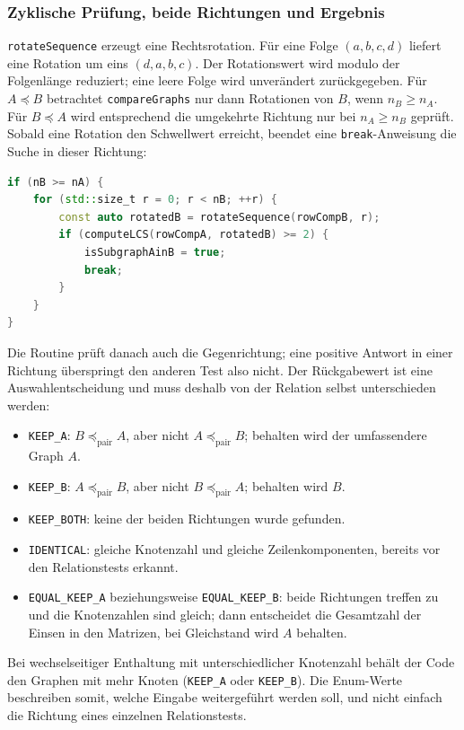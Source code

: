 \documentclass[a4paper,12pt, twoside]{report}
\theoremstyle{definition}
\begin{document}
\subsubsection*{Zyklische Prüfung, beide Richtungen und Ergebnis}

\texttt{rotateSequence} erzeugt eine Rechtsrotation. Für eine Folge $(a,b,c,d)$ liefert eine Rotation um eins $(d,a,b,c)$. Der Rotationswert wird modulo der Folgenlänge reduziert; eine leere Folge wird unverändert zurückgegeben. Für $A\preceq B$ betrachtet \texttt{compareGraphs} nur dann Rotationen von $B$, wenn $n_B\ge n_A$. Für $B\preceq A$ wird entsprechend die umgekehrte Richtung nur bei $n_A\ge n_B$ geprüft. Sobald eine Rotation den Schwellwert erreicht, beendet eine \texttt{break}-Anweisung die Suche in dieser Richtung:

\begin{lstlisting}[language=C++, caption={Abbruch nach einem passenden zyklischen Vergleich}]
if (nB >= nA) {
    for (std::size_t r = 0; r < nB; ++r) {
        const auto rotatedB = rotateSequence(rowCompB, r);
        if (computeLCS(rowCompA, rotatedB) >= 2) {
            isSubgraphAinB = true;
            break;
        }
    }
}
\end{lstlisting}

Die Routine prüft danach auch die Gegenrichtung; eine positive Antwort in einer Richtung überspringt den anderen Test also nicht. Der Rückgabewert ist eine Auswahlentscheidung und muss deshalb von der Relation selbst unterschieden werden:
\begin{itemize}
	\item \texttt{KEEP\_A}: $B\preceq_{\mathrm{pair}} A$, aber nicht $A\preceq_{\mathrm{pair}} B$; behalten wird der umfassendere Graph $A$.
	\item \texttt{KEEP\_B}: $A\preceq_{\mathrm{pair}} B$, aber nicht $B\preceq_{\mathrm{pair}} A$; behalten wird $B$.
	\item \texttt{KEEP\_BOTH}: keine der beiden Richtungen wurde gefunden.
	\item \texttt{IDENTICAL}: gleiche Knotenzahl und gleiche Zeilenkomponenten, bereits vor den Relationstests erkannt.
	\item \texttt{EQUAL\_KEEP\_A} beziehungsweise \texttt{EQUAL\_KEEP\_B}: beide Richtungen treffen zu und die Knotenzahlen sind gleich; dann entscheidet die Gesamtzahl der Einsen in den Matrizen, bei Gleichstand wird $A$ behalten.
\end{itemize}
Bei wechselseitiger Enthaltung mit unterschiedlicher Knotenzahl behält der Code den Graphen mit mehr Knoten (\texttt{KEEP\_A} oder \texttt{KEEP\_B}). Die Enum-Werte beschreiben somit, welche Eingabe weitergeführt werden soll, und nicht einfach die Richtung eines einzelnen Relationstests.
\end{document}
